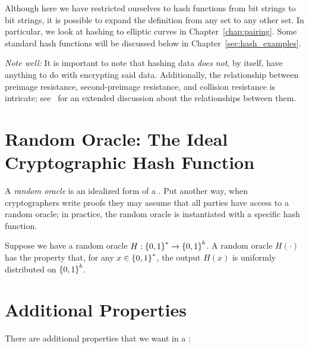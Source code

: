 Although here we have restricted ourselves to \glspl{hash function}
from bit strings to bit strings,
it is possible to expand the definition from any \gls{set} to
any other \gls{set}.
In particular, we look at hashing to \glspl{elliptic curve} in
Chapter~\ref{chap:pairing}.
Some standard \glspl{hash function} will be discussed below
in Chapter~\ref{sec:hash_examples}.

\emph{Note well:} It is important to note that hashing data
\emph{does not}, by itself, have anything to do with encrypting
said data.
Additionally, the relationship between preimage resistance,
second-preimage resistance, and collision resistance is intricate;
see~\cite{cryptoeprint:2004:035} for an extended discussion about
the relationships between them.



\section{Random Oracle: The Ideal Cryptographic Hash Function}
\label{sec:random_oracle}

A \emph{\gls{random oracle}} is an idealized form of a
.
Put another way, when cryptographers write proofs they may
assume that all parties have access to a \gls{random oracle};
in practice, the \gls{random oracle} is instantiated with a specific
\gls{hash function}.

Suppose we have a \gls{random oracle} $H:\left\{ 0,1 \right\}^{*}\to\left\{ 0,1 \right\}^{b}$.
A \gls{random oracle} $H(\cdot)$ has the property that,
for any $x\in\left\{ 0,1 \right\}^{*}$,
the output $H(x)$ is uniformly distributed on $\left\{ 0,1 \right\}^{b}$.



\section{Additional Properties}
\label{sec:additional_hash_properties}

There are additional properties that we want in a :

